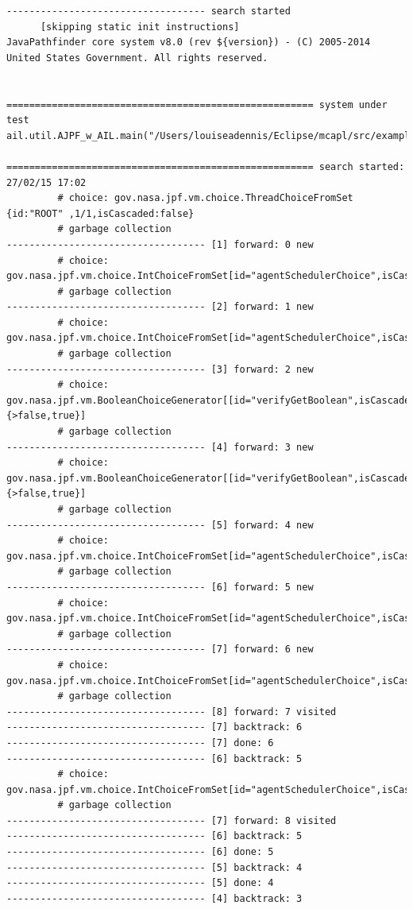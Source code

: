 \begin{small}
\begin{verbatim}
----------------------------------- search started
      [skipping static init instructions]
JavaPathfinder core system v8.0 (rev ${version}) - (C) 2005-2014 United States Government. All rights reserved.


====================================================== system under test
ail.util.AJPF_w_AIL.main("/Users/louiseadennis/Eclipse/mcapl/src/examples/gwendolen/ajpf_tutorials/tutorial2/TwoPickUpAgents.ail","/Users/louiseadennis/Eclipse/mcapl/src/examples/gwendolen/ajpf_tutorials/tutorial2/PickUpAgent.psl","1")

====================================================== search started: 27/02/15 17:02
		 # choice: gov.nasa.jpf.vm.choice.ThreadChoiceFromSet {id:"ROOT" ,1/1,isCascaded:false}
		 # garbage collection
----------------------------------- [1] forward: 0 new
		 # choice: gov.nasa.jpf.vm.choice.IntChoiceFromSet[id="agentSchedulerChoice",isCascaded:false,>0,1]
		 # garbage collection
----------------------------------- [2] forward: 1 new
		 # choice: gov.nasa.jpf.vm.choice.IntChoiceFromSet[id="agentSchedulerChoice",isCascaded:false,>0,1]
		 # garbage collection
----------------------------------- [3] forward: 2 new
		 # choice: gov.nasa.jpf.vm.BooleanChoiceGenerator[[id="verifyGetBoolean",isCascaded:false,{>false,true}]
		 # garbage collection
----------------------------------- [4] forward: 3 new
		 # choice: gov.nasa.jpf.vm.BooleanChoiceGenerator[[id="verifyGetBoolean",isCascaded:false,{>false,true}]
		 # garbage collection
----------------------------------- [5] forward: 4 new
		 # choice: gov.nasa.jpf.vm.choice.IntChoiceFromSet[id="agentSchedulerChoice",isCascaded:false,>0]
		 # garbage collection
----------------------------------- [6] forward: 5 new
		 # choice: gov.nasa.jpf.vm.choice.IntChoiceFromSet[id="agentSchedulerChoice",isCascaded:false,>0,1]
		 # garbage collection
----------------------------------- [7] forward: 6 new
		 # choice: gov.nasa.jpf.vm.choice.IntChoiceFromSet[id="agentSchedulerChoice",isCascaded:false,>0]
		 # garbage collection
----------------------------------- [8] forward: 7 visited
----------------------------------- [7] backtrack: 6
----------------------------------- [7] done: 6
----------------------------------- [6] backtrack: 5
		 # choice: gov.nasa.jpf.vm.choice.IntChoiceFromSet[id="agentSchedulerChoice",isCascaded:false,0,>1]
		 # garbage collection
----------------------------------- [7] forward: 8 visited
----------------------------------- [6] backtrack: 5
----------------------------------- [6] done: 5
----------------------------------- [5] backtrack: 4
----------------------------------- [5] done: 4
----------------------------------- [4] backtrack: 3
\end{verbatim}
\end{small}

